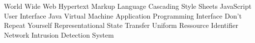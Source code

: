 \begin{acronym}[HTML]
			{World Wide Web}
			{Hypertext Markup Language}
			{Cascading Style Sheets}
			{JavaScript}
			{User Interface}
			{Java Virtual Machine}
   			{Application Programming Interface}
	 {Don't Repeat Yourself}
	 {Representational State Transfer}
	 {Uniform Ressource Identifier}
	 {Network Intrusion Detection System}
\end{acronym}
